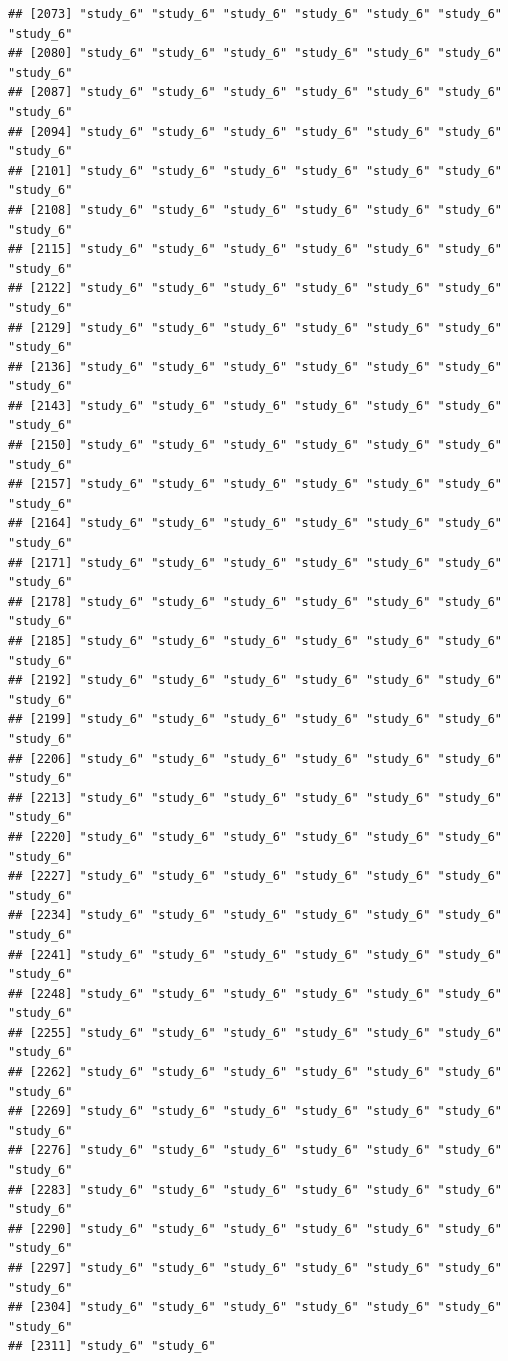 \documentclass[
  american,
  man,floatsintext]{apa7}
\begin{document}
\begin{verbatim}
## [2073] "study_6" "study_6" "study_6" "study_6" "study_6" "study_6" "study_6"
## [2080] "study_6" "study_6" "study_6" "study_6" "study_6" "study_6" "study_6"
## [2087] "study_6" "study_6" "study_6" "study_6" "study_6" "study_6" "study_6"
## [2094] "study_6" "study_6" "study_6" "study_6" "study_6" "study_6" "study_6"
## [2101] "study_6" "study_6" "study_6" "study_6" "study_6" "study_6" "study_6"
## [2108] "study_6" "study_6" "study_6" "study_6" "study_6" "study_6" "study_6"
## [2115] "study_6" "study_6" "study_6" "study_6" "study_6" "study_6" "study_6"
## [2122] "study_6" "study_6" "study_6" "study_6" "study_6" "study_6" "study_6"
## [2129] "study_6" "study_6" "study_6" "study_6" "study_6" "study_6" "study_6"
## [2136] "study_6" "study_6" "study_6" "study_6" "study_6" "study_6" "study_6"
## [2143] "study_6" "study_6" "study_6" "study_6" "study_6" "study_6" "study_6"
## [2150] "study_6" "study_6" "study_6" "study_6" "study_6" "study_6" "study_6"
## [2157] "study_6" "study_6" "study_6" "study_6" "study_6" "study_6" "study_6"
## [2164] "study_6" "study_6" "study_6" "study_6" "study_6" "study_6" "study_6"
## [2171] "study_6" "study_6" "study_6" "study_6" "study_6" "study_6" "study_6"
## [2178] "study_6" "study_6" "study_6" "study_6" "study_6" "study_6" "study_6"
## [2185] "study_6" "study_6" "study_6" "study_6" "study_6" "study_6" "study_6"
## [2192] "study_6" "study_6" "study_6" "study_6" "study_6" "study_6" "study_6"
## [2199] "study_6" "study_6" "study_6" "study_6" "study_6" "study_6" "study_6"
## [2206] "study_6" "study_6" "study_6" "study_6" "study_6" "study_6" "study_6"
## [2213] "study_6" "study_6" "study_6" "study_6" "study_6" "study_6" "study_6"
## [2220] "study_6" "study_6" "study_6" "study_6" "study_6" "study_6" "study_6"
## [2227] "study_6" "study_6" "study_6" "study_6" "study_6" "study_6" "study_6"
## [2234] "study_6" "study_6" "study_6" "study_6" "study_6" "study_6" "study_6"
## [2241] "study_6" "study_6" "study_6" "study_6" "study_6" "study_6" "study_6"
## [2248] "study_6" "study_6" "study_6" "study_6" "study_6" "study_6" "study_6"
## [2255] "study_6" "study_6" "study_6" "study_6" "study_6" "study_6" "study_6"
## [2262] "study_6" "study_6" "study_6" "study_6" "study_6" "study_6" "study_6"
## [2269] "study_6" "study_6" "study_6" "study_6" "study_6" "study_6" "study_6"
## [2276] "study_6" "study_6" "study_6" "study_6" "study_6" "study_6" "study_6"
## [2283] "study_6" "study_6" "study_6" "study_6" "study_6" "study_6" "study_6"
## [2290] "study_6" "study_6" "study_6" "study_6" "study_6" "study_6" "study_6"
## [2297] "study_6" "study_6" "study_6" "study_6" "study_6" "study_6" "study_6"
## [2304] "study_6" "study_6" "study_6" "study_6" "study_6" "study_6" "study_6"
## [2311] "study_6" "study_6"
\end{verbatim}
\end{document}
